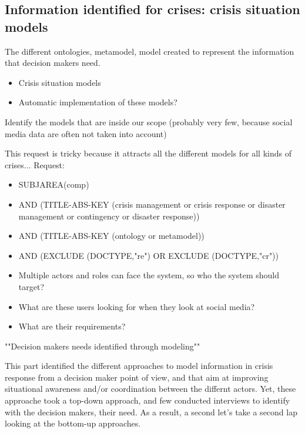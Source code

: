\subsection{Information identified for crises: crisis situation models}
The different ontologies, metamodel, model created to represent the information that decision makers need.
\begin{itemize}
    \item Crisis situation models
    \item Automatic implementation of these models?
\end{itemize}
Identify the models that are inside our scope (probably very few, because social media data are often not taken into account)

This request is tricky because it attracts all the different models for all kinds of crises...
Request:
\begin{itemize}
    \item SUBJAREA(comp)
    \item AND (TITLE-ABS-KEY ({crisis management} or {crisis response} or {disaster management} or contingency or {disaster response}))
    \item AND (TITLE-ABS-KEY (ontology or metamodel))
    \item AND (EXCLUDE (DOCTYPE,"re") OR EXCLUDE (DOCTYPE,"cr"))
\end{itemize}

\begin{itemize}
    \item Multiple actors and roles can face the system, so who the system should target?
    \item What are these users looking for when they look at social media?
    \item What are their requirements?
\end{itemize}


""Decision makers needs identified through modeling""

This part identified the different approaches to model information in crisis response from a decision maker point of view, and that aim at improving situational awareness and/or coordination between the differnt actors.
Yet, these approache took a top-down approach, and few conducted interviews to identify with the decision makers, their need.
As a result, a second let's take a second lap looking at the bottom-up approaches.

